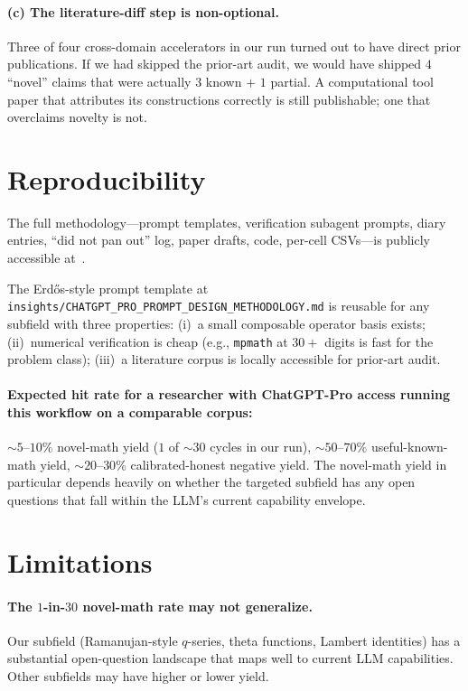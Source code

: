 \documentclass[11pt,reqno]{amsart}
\theoremstyle{definition}
\begin{document}
\paragraph{(c) The literature-diff step is non-optional.}
Three of four cross-domain accelerators in our run turned out to
have direct prior publications. If we had skipped the prior-art
audit, we would have shipped $4$ ``novel'' claims that were actually
$3$ known $+$ $1$ partial. A computational tool paper that
attributes its constructions correctly is still publishable; one
that overclaims novelty is not.

\section{Reproducibility}\label{sec:reproducibility}

The full methodology---prompt templates, verification subagent
prompts, diary entries, ``did not pan out'' log, paper drafts, code,
per-cell CSVs---is publicly accessible at~\cite{ProjectC}.

The Erd\H{o}s-style prompt template at
\verb|insights/CHATGPT_PRO_PROMPT_DESIGN_METHODOLOGY.md| is reusable
for any subfield with three properties: (i)~a small composable
operator basis exists; (ii)~numerical verification is cheap (e.g.,
\texttt{mpmath} at $30+$ digits is fast for the problem class);
(iii)~a literature corpus is locally accessible for prior-art audit.

\paragraph{Expected hit rate for a researcher with ChatGPT-Pro
access running this workflow on a comparable corpus:}
${\sim}5$--$10\%$ novel-math yield ($1$ of $\sim 30$ cycles in our
run), ${\sim}50$--$70\%$ useful-known-math yield, ${\sim}20$--$30\%$
calibrated-honest negative yield. The novel-math yield in particular
depends heavily on whether the targeted subfield has any open
questions that fall within the LLM's current capability envelope.

\section{Limitations}\label{sec:limitations}

\paragraph{The $1$-in-$30$ novel-math rate may not generalize.}
Our subfield (Ramanujan-style $q$-series, theta functions, Lambert
identities) has a substantial open-question landscape that maps well
to current LLM capabilities. Other subfields may have higher or
lower yield.
\end{document}
